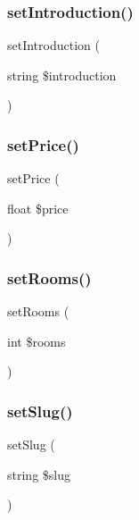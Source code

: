 \mbox{\label{class_app_1_1_entity_1_1_ad_a2783619c7c20ec3cdce7706c8e617324}} 
\subsubsection{\texorpdfstring{setIntroduction()}{setIntroduction()}}
{\footnotesize\ttfamily set\+Introduction (\begin{DoxyParamCaption}\item[{string}]{\$introduction }\end{DoxyParamCaption})}

\mbox{\label{class_app_1_1_entity_1_1_ad_a48d3688b6264543ff1017e3fe06ae7ca}} 
\subsubsection{\texorpdfstring{setPrice()}{setPrice()}}
{\footnotesize\ttfamily set\+Price (\begin{DoxyParamCaption}\item[{float}]{\$price }\end{DoxyParamCaption})}

\mbox{\label{class_app_1_1_entity_1_1_ad_a9e6a5245cd24ec7e44cfaa8e85cb008f}} 
\subsubsection{\texorpdfstring{setRooms()}{setRooms()}}
{\footnotesize\ttfamily set\+Rooms (\begin{DoxyParamCaption}\item[{int}]{\$rooms }\end{DoxyParamCaption})}

\mbox{\label{class_app_1_1_entity_1_1_ad_a80553db2cd69e4c5c48c124c95385012}} 
\subsubsection{\texorpdfstring{setSlug()}{setSlug()}}
{\footnotesize\ttfamily set\+Slug (\begin{DoxyParamCaption}\item[{string}]{\$slug }\end{DoxyParamCaption})}

